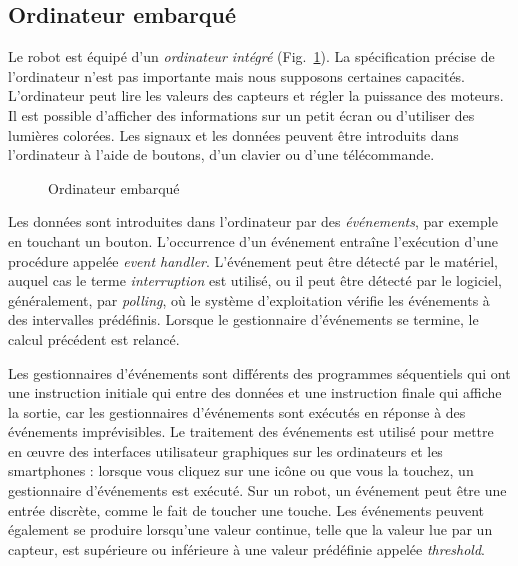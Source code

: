 \subsection{Ordinateur embarqué}\label{s.embedded}

Le robot est équipé d'un \emph{ordinateur intégré} (Fig.~\ref{fig.computer}). La spécification précise de l'ordinateur n'est pas importante mais nous supposons certaines capacités. L'ordinateur peut lire les valeurs des capteurs et régler la puissance des moteurs. Il est possible d'afficher des informations sur un petit écran ou d'utiliser des lumières colorées. Les signaux et les données peuvent être introduits dans l'ordinateur à l'aide de boutons, d'un clavier ou d'une télécommande.

\begin{figure}
\begin{center}
\caption{Ordinateur embarqué}\label{fig.computer}
\end{center}
\end{figure}

Les données sont introduites dans l'ordinateur par des \emph{événements}, par exemple en touchant un bouton. L'occurrence d'un événement entraîne l'exécution d'une procédure appelée \emph{event handler}. L'événement peut être détecté par le matériel, auquel cas le terme \emph{interruption} est utilisé, ou il peut être détecté par le logiciel, généralement, par \emph{polling}, où le système d'exploitation vérifie les événements à des intervalles prédéfinis. Lorsque le gestionnaire d'événements se termine, le calcul précédent est relancé.

Les gestionnaires d'événements sont différents des programmes séquentiels qui ont une instruction initiale qui entre des données et une instruction finale qui affiche la sortie, car les gestionnaires d'événements sont exécutés en réponse à des événements imprévisibles. Le traitement des événements est utilisé pour mettre en œuvre des interfaces utilisateur graphiques sur les ordinateurs et les smartphones : lorsque vous cliquez sur une icône ou que vous la touchez, un gestionnaire d'événements est exécuté. Sur un robot, un événement peut être une entrée discrète, comme le fait de toucher une touche. Les événements peuvent également se produire lorsqu'une valeur continue, telle que la valeur lue par un capteur, est supérieure ou inférieure à une valeur prédéfinie appelée \emph{threshold}.

